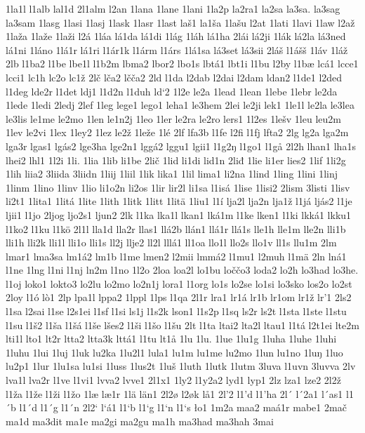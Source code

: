 1la1l
l1alb
lal1d
2l1alm
l2an
1lana
1lane
1lani
1la2p
la2ra1
la2sa
la3sa.
la3sag
la3sam
1lasg
1lasi
1lasj
1lask
1lasr
1last
laš1
la1ša
1lašu
l2at
1lati
1lavi
1law
l2až
1laža
1laže
1laži
l2á
1láa
lá1da
lá1di
1lág
1láh
lá1ha
2lái
lá2ji
1lák
lá2la
lá3ned
lá1ni
1láno
1lá1r
lá1ri
l1ár1k
l1árm
l1árs
1lá1sa
lá3set
lá3sii
2láš
l1ášš
1láv
1láž
2lb
l1ba2
l1be
lbe1l
l1b2m
lbma2
lbor2
lbo1s
lbtá1
lbt1i
l1bu
l2by
l1bæ
lcá1
lcce1
lcci1
lc1h
lc2o
lc1ž
2lč
lča2
lčča2
2ld
l1da
l2dab
l2dai
l2dam
ldan2
l1de1
l2ded
l1deg
lde2r
l1det
ldj1
l1d2n
l1duh
ld`2
1l2e
le2a
1lead
1lean
1lebe
1lebr
le2da
1lede
1ledi
2ledj
2lef
1leg
lege1
lego1
leha1
le3hem
2lei
le2ji
lek1
1le1l
le2la
le3lea
le3lis
le1me
le2mo
1len
le1n2j
1leo
1ler
le2ra
le2ro
lers1
1l2es
1lešv
1leu
leu2m
1lev
le2vi
1lex
1ley2
1lez
le2ž
1leže
1lé
2lf
lfa3b
l1fe
l2fi
l1fj
lfta2
2lg
lg2a
lga2m
lga3r
lgas1
lgás2
lge3ha
lge2n1
lggá2
lggu1
lgii1
l1g2ŋ
l1go1
l1gå
2l2h
lhan1
lha1s
lhei2
lhl1
1l2i
1li.
1lia
1lib
li1be
2lič
1lid
li1di
lid1n
2liđ
1lie
li1er
lies2
1lif
1li2g
1lih
liia2
3liida
3liidn
1liij
1liil
1lik
lika1
1lil
lima1
li2na
1lind
1ling
1lini
1linj
1linm
1lino
1linv
1lio
li1o2n
li2os
1lir
lir2l
li1sa
l1isá
1lise
1lisi2
2lism
3listi
1lisv
li2t1
1lita1
1litá
1lite
1lith
1litk
1litt
1litä
1liu1
l1í
lja2l
lja2n
lja1ž
l1já
ljás2
l1je
ljii1
l1jo
2ljog
ljo2s1
ljun2
2lk
l1ka
lka1l
lkan1
lká1m
l1ke
lken1
l1ki
lkká1
lkku1
l1ko2
l1ku
l1kö
2l1l
lla1d
lla2r
llas1
llá2b
llán1
llá1r
llá1s
lle1h
lle1m
lle2n
lli1b
lli1h
lli2k
lli1l
lli1o
lli1s
ll2j
llje2
ll2l
lllá1
ll1oa
llo1l
llo2s
llo1v
ll1s
llu1m
2lm
lmar1
lma3sa
lm1á2
lm1b
l1me
lmen2
l2mii
lmmá2
l1mu1
l2muh
l1mä
2ln
lná1
l1ne
1lng
l1ni
l1nj
ln2m
l1no
1l2o
2loa
loa2l
lo1bu
loččo3
loda2
lo2h
lo3had
lo3he.
l1oj
loko1
lokto3
lo2lu
lo2mo
lo2n1j
lora1
l1org
lo1s
lo2se
lo1si
lo3sko
los2o
lo2st
2loy
l1ó
lò1
2lp
lpa1l
lppa2
1lppl
1lps
l1qa
2l1r
lra1
lr1á
lr1b
lr1om
lr1ž
lr'1
2ls2
l1sa
l2sai
l1se
l2s1ei
l1sf
l1si
ls1j
l1s2k
lson1
l1s2p
l1sq
ls2r
ls2t
l1sta
l1ste
l1stu
l1su
l1š2
l1ša
l1šá
l1še
lšes2
l1ši
l1šo
l1šu
2lt
l1ta
ltai2
lta2l
ltau1
l1tá
l2t1ei
lte2m
lti1l
lto1
lt2r
ltta2
ltta3k
lttá1
l1tu
lt1å
1lu
1lu.
1lue
1lu1g
1luha
1luhe
1luhi
1luhu
1lui
1luj
1luk
lu2ka
1lu2l1
lula1
lu1m
lu1me
lu2mo
1lun
lu1no
1luŋ
1luo
lu2p1
1lur
1lu1sa
lu1si
1luss
1lus2t
1luš
1luth
1lutk
1lutm
3luva
l1uvn
3luvva
2lv
lva1l
lva2r
l1ve
l1vi1
lvva2
lvve1
2l1x1
1ly2
l1y2a2
lyd1
lyp1
2lz
lza1
lze2
2l2ž
l1ža
l1že
l1ži
l1žo
1læ
læ1r
1lä
län1
2l2ø
l2øk
lå1
2l'2
l1'd
l1'ha
2l´
l´2a1
l´as1
l1´b
l1´d
l1´g
l1´n
2l2`
l`á1
l1`b
l1`g
l1`n
l1`s
ło1
1m2a
maa2
maá1r
mabe1
2mač
ma1d
ma3dit
ma1e
ma2gi
ma2gu
ma1h
ma3had
ma3hah
3mai
